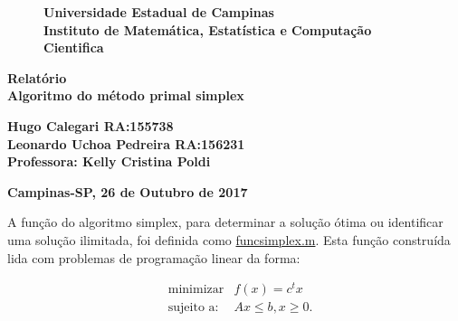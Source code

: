 \documentclass[10pt]{article}
\begin{document}
\begin{titlepage}
\begin{center}
\thispagestyle{empty}
\begin{figure}[!htb]
\begin{center}
\begin{minipage}[b]{0.5\linewidth}
\begin{center}
\end{center}
\end{minipage}
\begin{minipage}[b]{0.7\linewidth}
\begin{center}
\vspace*{1cm}
 {\large \bf Universidade Estadual de Campinas\\[5pt]
Instituto de Matemática, Estatística e Computação Cientifica\\[3pt]
}
\end{center}
\end{minipage}
\end{center}
\end{figure}
\begin{center}
\vspace*{5cm}
{\huge \bf Relatório\\[7pt]
Algoritmo do método primal simplex}
\end{center}
\begin{center}
\vspace*{4cm}
{\Large \bf Hugo Calegari  RA:155738 \\
Leonardo Uchoa Pedreira RA:156231\break
}\\[3pt]
{\large \bf Professora: Kelly Cristina Poldi}\\[5pt]
\end{center}
\centerline{\bf Campinas-SP, 26 de Outubro de 2017}
\end{center}
\end{titlepage}

A função do algoritmo simplex, para determinar a solução ótima ou identificar uma solução ilimitada, foi definida como \underline{funcsimplex.m}. Esta função construída lida com problemas de programação linear da forma:

\begin{align*}
&\text{minimizar}& f(x) = c^{t}x\\  
&\text{sujeito a:}& Ax \le b, x \ge 0.\\
\end{align*}  
\end{document}
